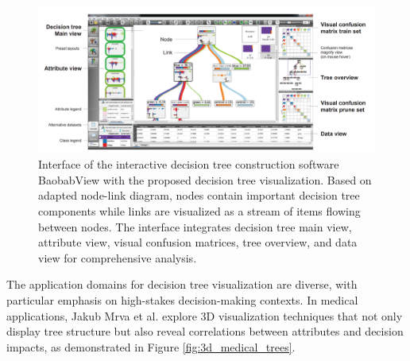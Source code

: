 \begin{figure}[!htb]
    \centering
    \includegraphics[width=\linewidth]{images/baobabView UI.png}
    \caption{Interface of the interactive decision tree construction software BaobabView with the proposed decision tree visualization. Based on adapted node-link diagram, nodes contain important decision tree components while links are visualized as a stream of items flowing between nodes. The interface integrates decision tree main view, attribute view, visual confusion matrices, tree overview, and data view for comprehensive analysis.}
    \label{fig:baobab_interface}
\end{figure}

The application domains for decision tree visualization are diverse, with particular emphasis on high-stakes decision-making contexts. In medical applications, Jakub Mrva et al. \cite{mrva2019decision} explore 3D visualization techniques that not only display tree structure but also reveal correlations between attributes and decision impacts, as demonstrated in Figure \ref{fig:3d_medical_trees}. 

